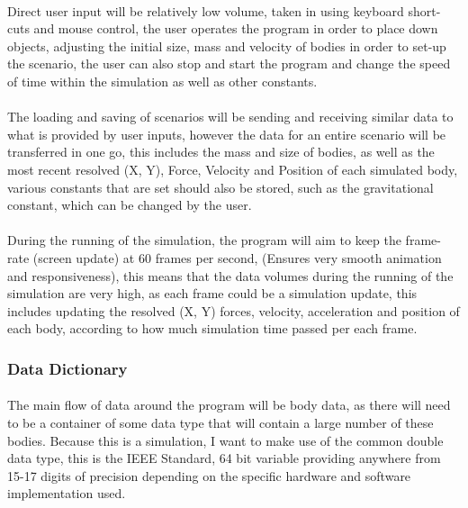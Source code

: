 \paragraph{}
Direct user input will be relatively low volume, taken in using keyboard short-cuts and mouse control, the user operates the program in order to place down objects, adjusting the initial size, mass and velocity of bodies in order to set-up the scenario, the user can also stop and start the program and change the speed of time within the simulation as well as other constants.

\paragraph{}
The loading and saving of scenarios will be sending and receiving similar data to what is provided by user inputs, however the data for an entire scenario will be transferred in one go, this includes the mass and size of bodies, as well as the most recent resolved (X, Y), Force, Velocity and Position of each simulated body, various constants that are set should also be stored, such as the gravitational constant, which can be changed by the user.

\paragraph{}
During the running of the simulation, the program will aim to keep the frame-rate (screen update) at 60 frames per second, (Ensures very smooth animation and responsiveness), this means that the data volumes during the running of the simulation are very high, as each frame could be a simulation update, this includes updating the resolved (X, Y) forces, velocity, acceleration and position of each body, according to how much simulation time passed per each frame.

\subsubsection{Data Dictionary}
\paragraph{}
The main flow of data around the program will be body data, as there will need to be a container of some data type that will contain a large number of these bodies. Because this is a simulation, I want to make use of the common double data type, this is the IEEE Standard, 64 bit variable providing anywhere from 15-17 digits of precision depending on the specific hardware and software implementation used.

